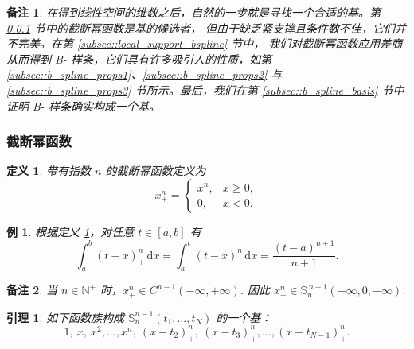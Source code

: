 \documentclass[a4paper]{ctexart}
\newtheorem{remark}{备注}
\newtheorem{definition}[theorem]{定义} %
\newtheorem{lemma}[theorem]{引理}
\newtheorem{example}[theorem]{例}
\numberwithin{theorem}{section}
\numberwithin{equation}{section}
\numberwithin{figure}{section}
\numberwithin{remark}{section}
\begin{document}
\begin{remark}
    \label{rem::after_dim_find_basis}
在得到线性空间的维数之后，自然的一步就是寻找一个合适的基。第 \ref{subsec::truncated_power_functions} 节中的截断幂函数是基的候选者，
但由于缺乏紧支撑且条件数不佳，它们并不完美。在第 \ref{subsec::local_support_bspline} 节中，
我们对截断幂函数应用差商从而得到 B- 样条，它们具有许多吸引人的性质，如第 \ref{subsec::b_spline_props1}、\ref{subsec::b_spline_props2} 
与 \ref{subsec::b_spline_props3} 节所示。最后，我们在第 \ref{subsec::b_spline_basis} 节中证明 B- 样条确实构成一个基。
\end{remark}

\subsubsection{截断幂函数}
\label{subsec::truncated_power_functions}

\begin{definition}
    \label{def::truncated_power}
带有指数 $n$ 的截断幂函数定义为
\begin{equation}
    \label{eq::truncated_power}    
x^{n}_{+}=
\begin{cases}
x^{n}, & x\ge 0,\\
0,     & x<0.
\end{cases}
\end{equation}

\end{definition}

\begin{example}
    \label{ex::tp_int}
根据定义 \ref{def::truncated_power}，对任意 $t\in[a,b]$ 有
\begin{equation}
    \label{eq::tp_int}
\int_{a}^{b}(t-x)_{+}^{n}\,\mathrm{d}x
=\int_{a}^{t}(t-x)^{n}\,\mathrm{d}x
=\frac{(t-a)^{n+1}}{n+1}.
\end{equation}
\end{example}

\begin{remark}
    \label{rem::tp_smooth}
当 $n\in\mathbb{N}^{+}$ 时，$x_{+}^{n}\in C^{n-1}(-\infty,+\infty)$. 
因此
$x_{+}^{n}\in \mathbb{S}^{\,n-1}_{n}(-\infty,0,+\infty)$.
\end{remark}

\begin{lemma}
    \label{lem::tp_basis}
如下函数族构成 $\mathbb{S}^{n-1}_{n}(t_1,\ldots,t_N)$ 的一个基：
\begin{equation}
\label{eq::tp_basis_list}
1,\ x,\ x^{2},\ldots,x^{n},\ (x-t_2)_{+}^{n},\ (x-t_3)_{+}^{n},\ldots,(x-t_{N-1})_{+}^{n}.
\end{equation}
\end{lemma}
\end{document}
